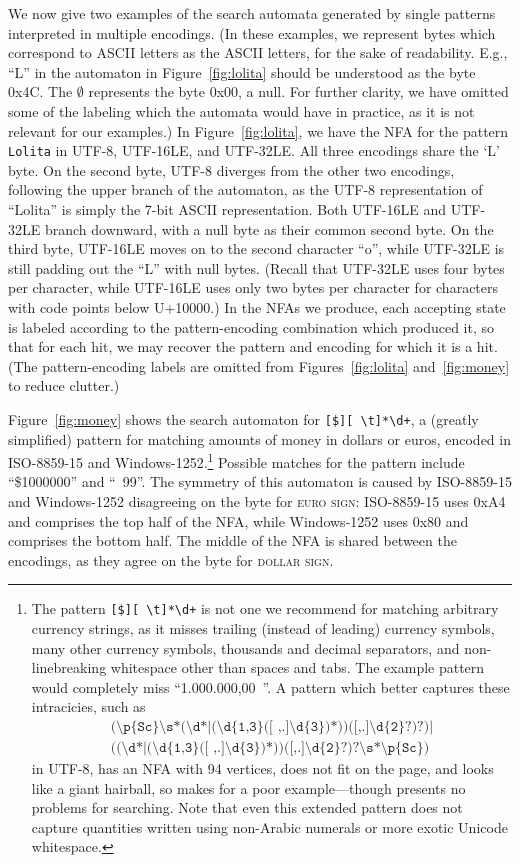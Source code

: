 \documentclass[5p,final,number,sort&compress]{elsarticle}
\newcommand{\re}[1]{\texttt{#1}}
\newcommand*{\whack}{\textbackslash}
\begin{document}
We now give two examples of the search automata generated by single patterns interpreted in multiple encodings. (In these examples, we represent bytes which correspond to ASCII letters as the ASCII letters, for the sake of readability. E.g., ``L'' in the automaton in Figure~\ref{fig:lolita} should be understood as the byte 0x4C. The $\emptyset$ represents the byte 0x00, a null. For further clarity, we have omitted some of the labeling which the automata would have in practice, as it is not relevant for our examples.) In Figure~\ref{fig:lolita}, we have the NFA for the pattern \re{Lolita} in UTF-8, UTF-16LE, and UTF-32LE. All three encodings share the `L' byte. On the second byte, UTF-8 diverges from the other two encodings, following the upper branch of the automaton, as the UTF-8 representation of ``Lolita'' is simply the 7-bit ASCII representation. Both UTF-16LE and UTF-32LE branch downward, with a null byte as their common second byte. On the third byte, UTF-16LE moves on to the second character ``o'', while UTF-32LE is still padding out the ``L'' with null bytes. (Recall that UTF-32LE uses four bytes per character, while UTF-16LE uses only two bytes per character for characters with code points below U+10000.) In the NFAs we produce, each accepting state is labeled according to the pattern-encoding combination which produced it, so that for each hit, we may recover the pattern and encoding for which it is a hit. (The pattern-encoding labels are omitted from Figures~\ref{fig:lolita} and~\ref{fig:money} to reduce clutter.)

Figure~\ref{fig:money} shows the search automaton for \re{[\texteuro\$][ \whack t]*\whack d+}, a (greatly simplified) pattern for matching amounts of money in dollars or euros, encoded in ISO-8859-15 and Windows-1252.\footnote{The pattern \re{[\texteuro\$][ \whack t]*\whack d+} is not one we recommend for matching arbitrary currency strings, as it misses trailing (instead of leading) currency symbols, many other currency symbols, thousands and decimal separators, and non-linebreaking whitespace other than spaces and tabs. The example pattern would completely miss ``1.000.000,00~\texteuro''. A pattern which better captures these intracicies, such as
\begin{multline*}
  \re{(\whack p\{Sc\}\whack s*(\whack d*|(\whack d\{1,3\}([~,.]\whack d\{3\})*))([,.]\whack d\{2\}?)?)|}
\\
\re{((\whack d*|(\whack d\{1,3\}([~,.]\whack d\{3\})*))([,.]\whack d\{2\}?)?\whack s*\whack p\{Sc\})}
\end{multline*}
in UTF-8, has an NFA with 94 vertices, does not fit on the page, and looks like a giant hairball, so makes for a poor example---though presents no problems for searching. Note that even this extended pattern does not capture quantities written using non-Arabic numerals or more exotic Unicode whitespace.} Possible matches for the pattern include ``\$1000000'' and ``\texteuro\ 99''. The symmetry of this automaton is caused by ISO-8859-15 and Windows-1252 disagreeing on the byte for \textsc{euro sign}: ISO-8859-15 uses 0xA4 and comprises the top half of the NFA, while Windows-1252 uses 0x80 and comprises the bottom half. The middle of the NFA is shared between the encodings, as they agree on the byte for \textsc{dollar sign}.
\end{document}

